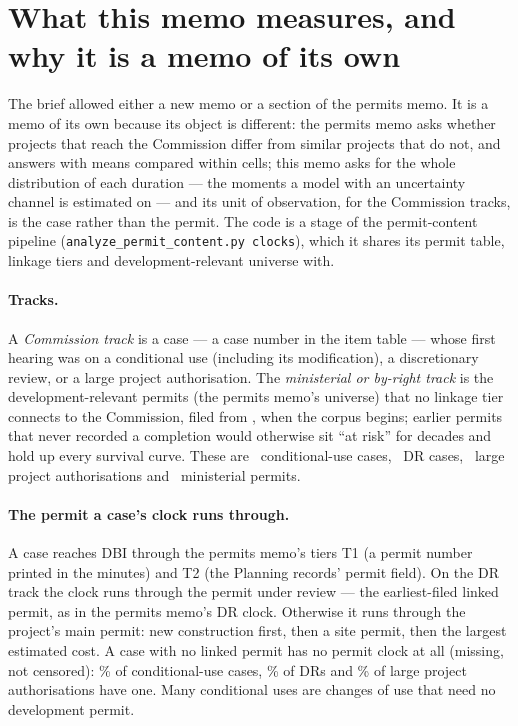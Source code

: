 \documentclass[11pt]{article}
\begin{document}
\clearpage
\tableofcontents
\newpage

\section{What this memo measures, and why it is a memo of its own}

The brief allowed either a new memo or a section of the permits memo. It is a memo of its own
because its object is different: the permits memo asks whether projects that reach the
Commission differ from similar projects that do not, and answers with means compared within
cells; this memo asks for the whole distribution of each duration --- the moments a model with
an uncertainty channel is estimated on --- and its unit of observation, for the Commission
tracks, is the case rather than the permit. The code is a stage of the permit-content pipeline
(\texttt{analyze\_permit\_content.py clocks}), which it shares its permit table, linkage tiers
and development-relevant universe with.

\paragraph{Tracks.} A \emph{Commission track} is a case --- a case number in the item table ---
whose first hearing was on a conditional use (including its modification), a discretionary
review, or a large project authorisation. The \emph{ministerial or by-right track} is the
development-relevant permits (the permits memo's universe) that no linkage tier connects to the
Commission, filed from \ckClockFrom, when the corpus begins; earlier permits that never
recorded a completion would otherwise sit ``at risk'' for decades and hold up every survival
curve. These are \ckUnitsCu\ conditional-use cases, \ckUnitsDr\ DR cases, \ckUnitsLpa\ large
project authorisations and \ckUnitsMin\ ministerial permits.

\paragraph{The permit a case's clock runs through.} A case reaches DBI through the permits
memo's tiers T1 (a permit number printed in the minutes) and T2 (the Planning records' permit
field). On the DR track the clock runs through the permit under review --- the earliest-filed
linked permit, as in the permits memo's DR clock. Otherwise it runs through the project's main
permit: new construction first, then a site permit, then the largest estimated cost. A case
with no linked permit has no permit clock at all (missing, not censored): \ckPermitPctCu\% of
conditional-use cases, \ckPermitPctDr\% of DRs and \ckPermitPctLpa\% of large project
authorisations have one. Many conditional uses are changes of use that need no
development permit.
\end{document}
